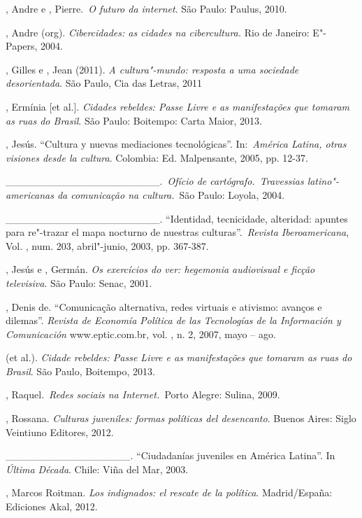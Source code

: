 , Andre e , Pierre.~\emph{O futuro da internet}. São Paulo:
Paulus, 2010.

, Andre (org). \emph{Cibercidades: as cidades na cibercultura.} Rio
de Janeiro: E"-Papers, 2004.

, Gilles e , Jean (2011). \emph{A cultura"-mundo:
resposta a uma sociedade desorientada}. São Paulo, Cia das Letras, 2011

, Ermínia {[}et al.{]}. \emph{Cidades rebeldes: Passe Livre e as
manifestações que tomaram as ruas do Brasil}. São Paulo: Boitempo: Carta
Maior, 2013.

, Jesús. ``Cultura y nuevas mediaciones tecnológicas''.
In:~\emph{América Latina, otras visiones desde la cultura}. Colombia:
Ed. Malpensante, 2005, pp. 12-37.

\_\_\_\_\_\_\_\_\_\_\_\_\_\_\_\_\_\_\_\_\_.~\emph{Ofício de
cartógrafo.~Travessias latino"-americanas da comunicação na cultura.}~São
Paulo: Loyola, 2004.

\_\_\_\_\_\_\_\_\_\_\_\_\_\_\_\_\_\_\_\_\_. ``Identidad, tecnicidade,
alteridad: apuntes para re"-trazar el mapa nocturno de nuestras
culturas''.~\emph{Revista Iberoamericana}, Vol. , num. 203,
abril"-junio, 2003, pp. 367-387.

, Jesús e , Germán. \emph{Os exercícios do ver:
hegemonia audiovisual e ficção televisiva}. São Paulo: Senac, 2001.

, Denis de. ``Comunicação alternativa, redes virtuais e ativismo:
avanços e dilemas''. \emph{Revista de Economía Política de las
Tecnologías de la Información y Comunicación} www.eptic.com.br, vol. ,
n. 2, 2007, mayo -- ago.

 (et al.). \emph{Cidade rebeldes: Passe Livre e as
manifestações que tomaram as ruas do Brasil}. São Paulo, Boitempo, 2013.

, Raquel.~\emph{Redes sociais na Internet.~}Porto Alegre: Sulina,
2009.

, Rossana. \emph{Culturas juveniles: formas políticas del
desencanto}. Buenos Aires: Siglo Veintiuno Editores, 2012.

\_\_\_\_\_\_\_\_\_\_\_\_\_\_\_\_\_. ``Ciudadanías juveniles en América
Latina''. In \emph{Última Década}. Chile: Viña del Mar, 2003.

, Marcos Roitman. \emph{Los indignados: el rescate de la
política}. Madrid/España: Ediciones Akal, 2012.

